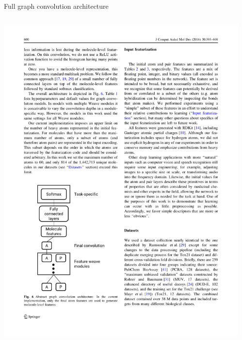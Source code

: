 \documentclass[compress]{beamer}
\begin{document}
\begin{frame}{Full graph convolution architecture}
  \begin{columns}
    \begin{column}{0.50\textwidth}
      \includegraphics[width=1.00\textwidth]{./figures/gc_fig6.pdf}
    \end{column}
    \begin{column}{0.50\textwidth}
    \end{column}
  \end{columns}
\end{frame}
\end{document}
